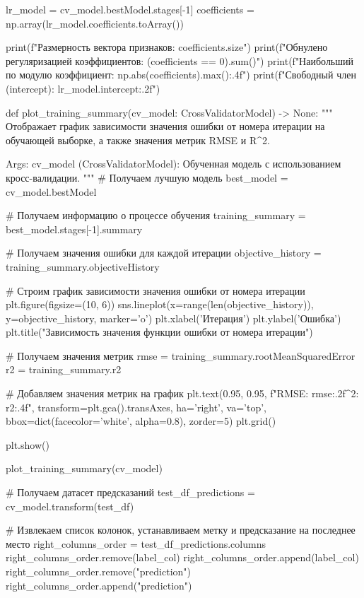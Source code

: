 \begin{code}
lr_model = cv_model.bestModel.stages[-1]
coefficients = np.array(lr_model.coefficients.toArray())

print(f"Размерность вектора признаков: {coefficients.size}")
print(f"Обнулено регуляризацией коэффициентов: {(coefficients == 0).sum()}")
print(f"Наибольший по модулю коэффициент: {np.abs(coefficients).max():.4f}")
print(f"Свободный член (intercept): {lr_model.intercept:.2f}")

def plot_training_summary(cv_model: CrossValidatorModel) -> None:
    """
    Отображает график зависимости значения ошибки от номера итерации на
    обучающей выборке, а также значения метрик RMSE и R^2.

    Args:
        cv_model (CrossValidatorModel): Обученная модель с использованием
            кросс-валидации.
    """
    # Получаем лучшую модель
    best_model = cv_model.bestModel

    # Получаем информацию о процессе обучения
    training_summary = best_model.stages[-1].summary

    # Получаем значения ошибки для каждой итерации
    objective_history = training_summary.objectiveHistory

    # Строим график зависимости значения ошибки от номера итерации
    plt.figure(figsize=(10, 6))
    sns.lineplot(x=range(len(objective_history)),
                 y=objective_history,
                 marker='o')
    plt.xlabel('Итерация')
    plt.ylabel('Ошибка')
    plt.title("Зависимость значения функции ошибки от номера итерации")

    # Получаем значения метрик
    rmse = training_summary.rootMeanSquaredError
    r2 = training_summary.r2

    # Добавляем значения метрик на график
    plt.text(0.95, 0.95, f"RMSE: {rmse:.2f}\nR^2: {r2:.4f}",
             transform=plt.gca().transAxes, ha='right', va='top',
             bbox=dict(facecolor='white', alpha=0.8), zorder=5)
    plt.grid()

    plt.show()

plot_training_summary(cv_model)

# Получаем датасет предсказаний
test_df_predictions = cv_model.transform(test_df)

# Извлекаем список колонок, устанавливаем метку и предсказание на последнее место
right_columns_order = test_df_predictions.columns
right_columns_order.remove(label_col)
right_columns_order.append(label_col)
right_columns_order.remove("prediction")
right_columns_order.append("prediction")


\end{code}
